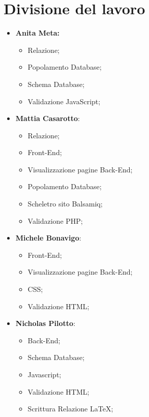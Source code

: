\section{Divisione del lavoro}\label{sec:divisione}
\begin{itemize}
	\item \textbf{Anita Meta:}
		\begin{itemize}
			\item Relazione;
			\item Popolamento Database;
			\item Schema Database;
			\item Validazione JavaScript;
		\end{itemize}
	\item \textbf{Mattia Casarotto}:
		\begin{itemize}
			\item Relazione;
			\item Front-End;
			\item Visualizzazione pagine Back-End;
			\item Popolamento Database;
			\item Scheletro sito Balsamiq;
			\item Validazione PHP;
		\end{itemize}
	\item \textbf{Michele Bonavigo}:
		\begin{itemize}
			\item Front-End;
			\item Visualizzazione pagine Back-End;
			\item CSS;
			\item Validazione HTML;
		\end{itemize}
	\item \textbf{Nicholas Pilotto}:
		\begin{itemize}
			\item Back-End;
			\item Schema Database;
			\item Javascript;
			\item Validazione HTML;
			\item Scrittura Relazione LaTeX;
		\end{itemize}
\end{itemize}